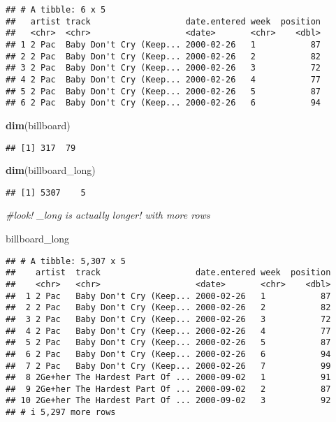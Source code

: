 \documentclass[
]{article}
\newenvironment{Shaded}{\begin{snugshade}}{\end{snugshade}}
\newcommand{\CommentTok}[1]{\textcolor[rgb]{0.56,0.35,0.01}{\textit{#1}}}
\newcommand{\FunctionTok}[1]{\textcolor[rgb]{0.13,0.29,0.53}{\textbf{#1}}}
\newcommand{\NormalTok}[1]{#1}
\begin{document}
\begin{verbatim}
## # A tibble: 6 x 5
##   artist track                   date.entered week  position
##   <chr>  <chr>                   <date>       <chr>    <dbl>
## 1 2 Pac  Baby Don't Cry (Keep... 2000-02-26   1           87
## 2 2 Pac  Baby Don't Cry (Keep... 2000-02-26   2           82
## 3 2 Pac  Baby Don't Cry (Keep... 2000-02-26   3           72
## 4 2 Pac  Baby Don't Cry (Keep... 2000-02-26   4           77
## 5 2 Pac  Baby Don't Cry (Keep... 2000-02-26   5           87
## 6 2 Pac  Baby Don't Cry (Keep... 2000-02-26   6           94
\end{verbatim}

\begin{Shaded}
\begin{Highlighting}[]
\FunctionTok{dim}\NormalTok{(billboard)}
\end{Highlighting}
\end{Shaded}

\begin{verbatim}
## [1] 317  79
\end{verbatim}

\begin{Shaded}
\begin{Highlighting}[]
\FunctionTok{dim}\NormalTok{(billboard\_long)}
\end{Highlighting}
\end{Shaded}

\begin{verbatim}
## [1] 5307    5
\end{verbatim}

\begin{Shaded}
\begin{Highlighting}[]
\CommentTok{\#look! \_long is actually longer! with more rows}
\end{Highlighting}
\end{Shaded}

\begin{Shaded}
\begin{Highlighting}[]
\NormalTok{billboard\_long}
\end{Highlighting}
\end{Shaded}

\begin{verbatim}
## # A tibble: 5,307 x 5
##    artist  track                   date.entered week  position
##    <chr>   <chr>                   <date>       <chr>    <dbl>
##  1 2 Pac   Baby Don't Cry (Keep... 2000-02-26   1           87
##  2 2 Pac   Baby Don't Cry (Keep... 2000-02-26   2           82
##  3 2 Pac   Baby Don't Cry (Keep... 2000-02-26   3           72
##  4 2 Pac   Baby Don't Cry (Keep... 2000-02-26   4           77
##  5 2 Pac   Baby Don't Cry (Keep... 2000-02-26   5           87
##  6 2 Pac   Baby Don't Cry (Keep... 2000-02-26   6           94
##  7 2 Pac   Baby Don't Cry (Keep... 2000-02-26   7           99
##  8 2Ge+her The Hardest Part Of ... 2000-09-02   1           91
##  9 2Ge+her The Hardest Part Of ... 2000-09-02   2           87
## 10 2Ge+her The Hardest Part Of ... 2000-09-02   3           92
## # i 5,297 more rows
\end{verbatim}
\end{document}
